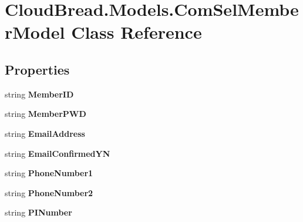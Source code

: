 \hypertarget{a00067}{}\section{Cloud\+Bread.\+Models.\+Com\+Sel\+Member\+Model Class Reference}
\label{a00067}
\subsection*{Properties}
\begin{DoxyCompactItemize}
\item 
string {\bfseries Member\+ID}\hypertarget{a00067_a6ae55ba2ec659c52f1aa73ae08395363}{}\label{a00067_a6ae55ba2ec659c52f1aa73ae08395363}

\item 
string {\bfseries Member\+P\+WD}\hypertarget{a00067_a0e1fbefa363f75093a5e8750644c60ad}{}\label{a00067_a0e1fbefa363f75093a5e8750644c60ad}

\item 
string {\bfseries Email\+Address}\hypertarget{a00067_a8ed80ad0f258af561f6a3e040d090074}{}\label{a00067_a8ed80ad0f258af561f6a3e040d090074}

\item 
string {\bfseries Email\+Confirmed\+YN}\hypertarget{a00067_a5550d40cc9854bca9000d49ce42389d6}{}\label{a00067_a5550d40cc9854bca9000d49ce42389d6}

\item 
string {\bfseries Phone\+Number1}\hypertarget{a00067_a477fff53e9a49f51ea5291f60bb795c1}{}\label{a00067_a477fff53e9a49f51ea5291f60bb795c1}

\item 
string {\bfseries Phone\+Number2}\hypertarget{a00067_acdbb39bf4df95e704ebde45fe55081ec}{}\label{a00067_acdbb39bf4df95e704ebde45fe55081ec}

\item 
string {\bfseries P\+I\+Number}\hypertarget{a00067_ad8aef8c528fc5037ec95dac1aaadb160}{}\label{a00067_ad8aef8c528fc5037ec95dac1aaadb160}


\end{DoxyCompactItemize}
